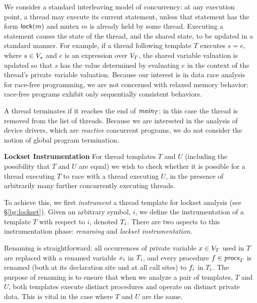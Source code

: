 We consider a standard interleaving model of concurrency: at any execution point, a thread may execute its current statement, unless that statement has the form $\mathsf{lock}(m)$ and mutex $m$ is already held by some thread.  Executing a statement causes the state of the thread, and the shared state, to be updated in a standard manner.  For example, if a thread following template $T$ executes $s = e$, where $s \in V_s$ and $e$ is an expression over $V_{T}$, the shared variable valuation is updated so that $s$ has the value determined by evaluating $e$ in the context of the thread's private variable valuation.  Because our interest is in data race analysis for race-free programming, we are not concerned with relaxed memory behavior: race-free programs exhibit only sequentially consistent behaviors.

A thread terminates if it reaches the end of $\mathit{main}_{T}$; in this case the thread is removed from the list of threads.  Because we are interested in the analysis of device drivers, which are \emph{reactive} concurrent programs, we do not consider the notion of global program termination.

\medskip\noindent\textbf{Lockset Instrumentation }
%
For thread templates $T$ and $U$ (including the possibility that $T$ and $U$ are equal) we wish to check whether it is possible for a thread executing $T$ to race with a thread executing $U$, in the presence of arbitrarily many further concurrently executing threads.

To achieve this, we first \emph{instrument} a thread template for lockset analysis (see \S\ref{bg:lockset}).  Given an arbitrary symbol, $i$, we define the instrumentation of a template $T$ with respect to $i$, denoted $T_{i}$.  There are two aspects to this instrumentation phase: \emph{renaming} and \emph{lockset instrumentation}.

Renaming is straightforward: all occurrences of private variable $x \in V_{T}$ used in $T$ are replaced with a renamed variable $x_{i}$ in $T_{i}$, and every procedure $f \in \mathit{procs}_{T}$ is renamed (both at its declaration site and at all call sites) to $f_{i}$ in $T_{i}$.  The purpose of renaming is to ensure that when we analyze a pair of templates, $T$ and $U$, both templates execute distinct procedures and operate on distinct private data.  This is vital in the case where $T$ and $U$ are the same.

